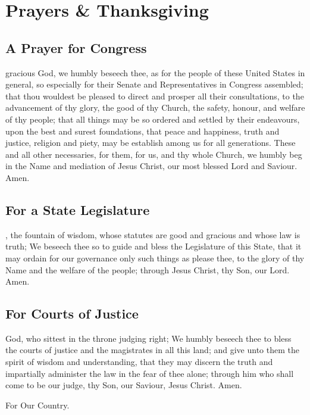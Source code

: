 \section{Prayers \& Thanksgiving}
\subsection{A Prayer for Congress}
 gracious God, we humbly beseech thee, as for the people of these United States in general, so especially for their Senate and Representatives in Congress assembled; that thou wouldest be pleased to direct and prosper all their consultations, to the advancement of thy glory, the good of thy Church, the safety, honour, and welfare of thy people; that all things may be so ordered and settled by their endeavours, upon the best and surest foundations, that peace and happiness, truth and justice, religion and piety, may be establish among us for all generations. These and all other necessaries, for them, for us, and thy whole Church, we humbly beg in the Name and mediation of Jesus Christ, our most blessed Lord and Saviour. Amen.
\subsection{For a State Legislature}
, the fountain of wisdom, whose statutes are good and gracious and whose law is truth; We beseech thee so to guide and bless the Legislature of this State, that it may ordain for our governance only such things as please thee, to the glory of thy Name and the welfare of the people; through Jesus Christ, thy Son, our Lord. Amen.

\subsection{For Courts of Justice}
 God, who sittest in the throne judging right; We humbly beseech thee to bless the courts of justice and the magistrates in all this land; and give unto them the spirit of wisdom and understanding, that they may discern the truth and impartially administer the law in the fear of thee alone; through him who shall come to be our judge, thy Son, our Saviour, Jesus Christ. Amen.

For Our Country.

